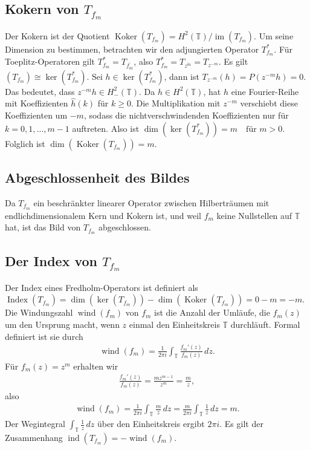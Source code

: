 \documentclass[11pt, hidelinks]{article}
\numberwithin{conj}{section}
\begin{document}
\subsection{Kokern von \( T_{f_m} \)}
Der Kokern ist der Quotient $\operatorname{Koker}(T_{f_m}) = H^2(\mathbb{T}) / \operatorname{im}(T_{f_m})$. Um seine Dimension zu bestimmen, betrachten wir den adjungierten Operator \( T_{f_m}^* \). Für Toeplitz-Operatoren gilt \( T_{f_m}^* = T_{\overline{f_m}} \), also $T_{f_m}^* = T_{\overline{z^m}} = T_{z^{-m}}$. Es gilt $(T_{f_m}) \cong \ker(T_{f_m}^*)$. Sei \( h \in \ker(T_{f_m}^*) \), dann ist $T_{z^{-m}}(h) = P(z^{-m} h) = 0$. Das bedeutet, dass \( z^{-m} h \in H^2_-(\mathbb{T}) \). Da \( h \in H^2(\mathbb{T}) \), hat \( h \) eine Fourier-Reihe mit Koeffizienten \( \hat{h}(k) \) für \( k \geq 0 \). Die Multiplikation mit \( z^{-m} \) verschiebt diese Koeffizienten um \( -m \), sodass die nichtverschwindenden Koeffizienten nur für \( k = 0, 1, \ldots, m - 1 \) auftreten. Also ist $\dim(\ker(T_{f_m}^*)) = m \quad \text{für } m > 0$. Folglich ist $\dim(\operatorname{Koker}(T_{f_m})) = m$.

\subsection{Abgeschlossenheit des Bildes}
Da \( T_{f_m} \) ein beschränkter linearer Operator zwischen Hilberträumen mit endlichdimensionalem Kern und Kokern ist, und weil \( f_m \) keine Nullstellen auf \( \mathbb{T} \) hat, ist das Bild von \( T_{f_m} \) abgeschlossen.

\subsection{Der Index von \( T_{f_m} \)}
Der Index eines Fredholm-Operators ist definiert als $\operatorname{Index}(T_{f_m}) = \dim(\ker(T_{f_m})) - \dim(\operatorname{Koker}(T_{f_m})) = 0 - m = -m$. Die Windungszahl \( \operatorname{wind}(f_m) \) von \( f_m \) ist die Anzahl der Umläufe, die \( f_m(z) \) um den Ursprung macht, wenn \( z \) einmal den Einheitskreis \( \mathbb{T} \) durchläuft. Formal definiert ist sie durch
\begin{align}
    \operatorname{wind}(f_m) = \frac{1}{2\pi i} \int_{\mathbb{T}} \frac{f_m'(z)}{f_m(z)} \, dz.
\end{align}
Für \( f_m(z) = z^m \) erhalten wir
\begin{align}
    \frac{f_m'(z)}{f_m(z)} = \frac{m z^{m-1}}{z^m} = \frac{m}{z},
\end{align}
also
\begin{align}
\operatorname{wind}(f_m) = \frac{1}{2\pi i} \int_{\mathbb{T}} \frac{m}{z} \, dz = \frac{m}{2\pi i} \int_{\mathbb{T}} \frac{1}{z} \, dz = m.
\end{align}
Der Wegintegral \(\int_{\mathbb{T}} \frac{1}{z} \, dz\) über den Einheitskreis ergibt \( 2\pi i \). Es gilt der Zusammenhang $\operatorname{ind}(T_{f_m}) = -\operatorname{wind}(f_m)$.

\singlespacing
\nocite{*}


\end{document}
